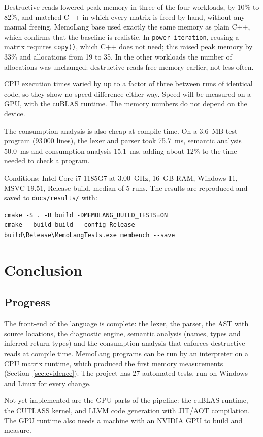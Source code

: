 \documentclass[a4paper]{article}
\begin{document}
	Destructive reads lowered peak memory in three of the four workloads, by 10\% to 82\%, and matched C++ in which every matrix is freed by hand, without any manual freeing. MemoLang base used exactly the same memory as plain C++, which confirms that the baseline is realistic. In \texttt{power\_iteration}, reusing a matrix requires \texttt{copy()}, which C++ does not need; this raised peak memory by 33\% and allocations from 19 to 35. In the other workloads the number of allocations was unchanged: destructive reads free memory earlier, not less often.

	CPU execution times varied by up to a factor of three between runs of identical code, so they show no speed difference either way. Speed will be measured on a GPU, with the cuBLAS runtime. The memory numbers do not depend on the device.

	The consumption analysis is also cheap at compile time. On a 3.6~MB test program (93\,000 lines), the lexer and parser took 75.7~ms, semantic analysis 50.0~ms and consumption analysis 15.1~ms, adding about 12\% to the time needed to check a program.

	Conditions: Intel Core i7-1185G7 at 3.00~GHz, 16~GB RAM, Windows 11, MSVC 19.51, Release build, median of 5 runs. The results are reproduced and saved to \texttt{docs/results/} with:
	\begin{lstlisting}[caption = Reproducing the measurements]
cmake -S . -B build -DMEMOLANG_BUILD_TESTS=ON
cmake --build build --config Release
build\Release\MemoLangTests.exe membench --save
	\end{lstlisting}
	\section{Conclusion}
	
	\subsection{Progress}
	The front-end of the language is complete: the lexer, the parser, the AST with source locations, the diagnostic engine, semantic analysis (names, types and inferred return types) and the consumption analysis that enforces destructive reads at compile time. MemoLang programs can be run by an interpreter on a CPU matrix runtime, which produced the first memory measurements (Section~\ref{sec:evidence}). The project has 27 automated tests, run on Windows and Linux for every change.

	Not yet implemented are the GPU parts of the pipeline: the cuBLAS runtime, the CUTLASS kernel, and LLVM code generation with JIT/AOT compilation. The GPU runtime also needs a machine with an NVIDIA GPU to build and measure.
\end{document}
